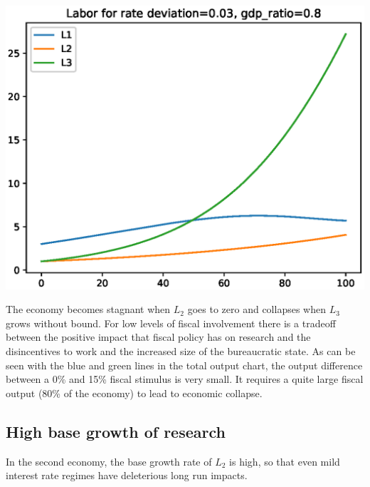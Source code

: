 \documentclass[12pt]{article}
\theoremstyle{definition}
\begin{document}
\begin{minipage}{\linewidth}
\begin{framed}
\begin{minipage}[t]{.48\textwidth}
\includegraphics[width=1\textwidth]{images/econ_0_run_4_labor}
\end{minipage}\hfill
\end{framed}
\end{minipage}

The economy becomes stagnant when \(L_2\) goes to zero and collapses when \(L_3\) grows without bound.  For low levels of fiscal involvement there is a tradeoff between the positive impact that fiscal policy has on research and the disincentives to work and the increased size of the bureaucratic state.  As can be seen with the blue and green lines in the total output chart, the output difference between a 0\% and 15\% fiscal stimulus is very small.  It requires a quite large fiscal output (80\% of the economy) to lead to economic collapse.

\subsection{High base growth of research}

In the second economy, the base growth rate of \(L_2\) is high, so that even mild interest rate regimes have deleterious long run impacts.
\end{document}
